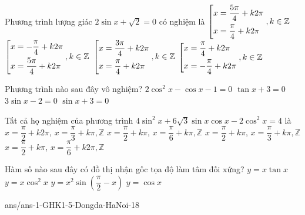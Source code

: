 \begin{ex}%
Phương trình lượng giác $2\sin x+\sqrt{2}=0$ có nghiệm là 
\choice
{$\left[\begin{aligned}&x=\dfrac{5\pi}{4}+k2\pi\\&x=\dfrac{\pi}{4}+k2\pi\end{aligned}\right.,k\in \mathbb{Z}$}
{\True $\left[\begin{aligned}&x=-\dfrac{\pi}{4}+k2\pi\\&x=\dfrac{5\pi}{4}+k2\pi\end{aligned}\right.,k\in \mathbb{Z}$}
{$\left[\begin{aligned}&x=\dfrac{3\pi}{4}+k2\pi\\&x=\dfrac{\pi}{4}+k2\pi\end{aligned}\right.,k\in \mathbb{Z}$}
{$\left[\begin{aligned}&x=\dfrac{\pi}{4}+k2\pi\\&x=-\dfrac{\pi}{4}+k2\pi\end{aligned}\right.,k\in \mathbb{Z}$}
\end{ex}

\begin{ex}%
Phương trình nào sau đây vô nghiệm?
\choice
{$2\cos^2x-\cos x-1=0$}
{$\tan x+3=0$}
{$3\sin x-2=0$}
{\True $\sin x +3=0$}
\end{ex}

\begin{ex}%
Tất cả họ nghiệm của phương trình $4\sin^2x+6\sqrt{3}\sin x \cos x-2\cos^2x=4$ là
\choice
{$x=\dfrac{\pi}{2}+k2\pi$, $x=\dfrac{\pi}{3}+k\pi, \mathbb{Z}$}
{\True $x=\dfrac{\pi}{2}+k\pi$, $x=\dfrac{\pi}{6}+k\pi, \mathbb{Z}$}
{$x=\dfrac{\pi}{2}+k\pi$, $x=\dfrac{\pi}{3}+k\pi,\mathbb{Z} $}
{$x=\dfrac{\pi}{2}+k\pi$, $x=\dfrac{\pi}{6}+k2\pi, \mathbb{Z}$}
\end{ex}

\begin{ex}%
Hàm số nào sau đây có đồ thị nhận gốc tọa độ làm tâm đối xứng?
\choice
{$y=x\tan x$}
{\True $y=x\cos^2x$}
{$y=x^2\sin \left (\dfrac{\pi}{2}-x\right )$}
{$y=\cos x$}
\end{ex}
\begin{indapan}{10}
	{ans/ans-1-GHK1-5-Dongda-HaNoi-18}
\end{indapan}
